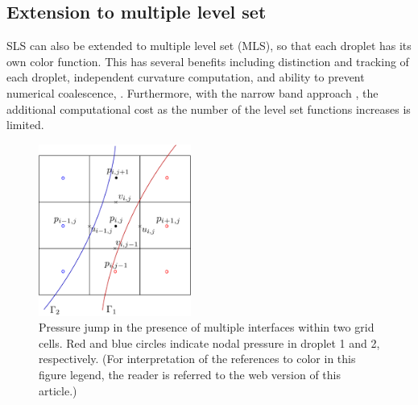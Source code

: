 \subsection{Extension to multiple level set}
\label{subsec: mls}

SLS can also be extended to multiple level set (MLS), so that each droplet has its own color function. This has several benefits including distinction and tracking of each droplet, independent curvature computation, and ability to prevent numerical coalescence, \etc. Furthermore, with the narrow band approach \citep{Adalsteinsson_JCP_1995,Peng_JCP_1999} , the additional computational  cost as the number of the level set functions increases is limited.


\begin{figure}[t]
 \begin{center}
 \includegraphics[width=5cm]{Figures/grid_mls.pdf}
 \end{center}
 \caption{Pressure jump in the presence of multiple interfaces within two grid cells. Red and blue circles indicate nodal pressure in droplet 1 and 2, respectively. (For interpretation of the references to color in this figure legend, the reader is referred to the web version of this article.)}
 \label{fig: GFM close}
\end{figure}

